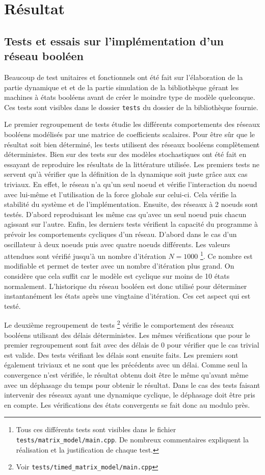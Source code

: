 \documentclass[11pt, a4paper]{article}
\begin{document}
\newpage
\section{Résultat}
\label{section_resultat}
\subsection{Tests et essais sur l'implémentation d'un réseau booléen}
Beaucoup de test unitaires et fonctionnels ont été fait sur l'élaboration de la
partie dynamique et et de la partie simulation de la bibliothèque gérant les
machines à états booléens avant de créer le moindre type de modèle quelconque.
Ces tests sont visibles dans le dossier \texttt{tests} du dossier de la
bibliothèque fournie.

Le premier regroupement de tests étudie les différents comportements des
réseaux booléens modélisés par une matrice de coefficients scalaires. Pour être
sûr que le résultat soit bien déterminé, les tests utilisent des réseaux
booléens complètement déterministes. Bien sur des tests sur des modèles
stochastiques ont été fait en essayant de reproduire les résultats de la
littérature utilisée. Les premiers tests ne servent qu'à vérifier que la
définition de la dynamique soit juste grâce aux cas triviaux. En effet, le
réseau n'a qu'un seul noeud et vérifie l'interaction du noeud avec lui-même et
l'utilisation de la force globale sur celui-ci. Cela vérifie la stabilité du
système et de l'implémentation. Ensuite, des réseaux à 2 noeuds sont testés.
D'abord reproduisant les même cas qu'avec un seul noeud puis chacun agissant
sur l'autre. Enfin, les derniers tests vérifient la capacité du programme à
prévoir les comportements cycliques d'un réseau. D'abord dans le cas d'un
oscillateur à deux noeuds puis avec quatre noeuds différents. Les valeurs
attendues sont vérifié jusqu'à un nombre d'itération $N = 1000$ \footnote{Tous
ces différents tests sont visibles dans le fichier
\texttt{tests/matrix\_model/main.cpp}. De nombreux commentaires expliquent la
réalisation et la justification de chaque test.}. Ce nombre est modifiable et
permet de tester avec un nombre d'itération plus grand. On considère que cela
suffit car le modèle est cyclique sur moins de 10 états normalement.
L'historique du réseau booléen est donc utilisé pour déterminer instantanément
les états après une vingtaine d'itération. Ces cet aspect qui est testé.

Le deuxième regroupement de tests \footnote{Voir
\texttt{tests/timed\_matrix\_model/main.cpp}} vérifie le comportement des
réseaux booléens utilisant des délais déterministes. Les mêmes vérifications
que pour le premier regroupement sont fait avec des délais de 0 pour vérifier
que le cas trivial est valide. Des tests vérifiant les délais sont ensuite
faits.  Les premiers sont également triviaux et ne sont que les précédents avec
un délai. Comme seul la convergence n'est vérifiée, le résultat obtenu doit
être le même qu'avant même avec un déphasage du temps pour obtenir le résultat.
Dans le cas des tests faisant intervenir des réseaux ayant une dynamique
cyclique, le déphasage doit être pris en compte. Les vérifications des états
convergents se fait donc au modulo près.
\end{document}
